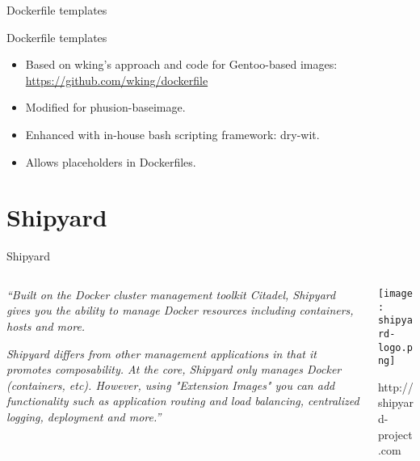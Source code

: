 \documentclass[presentation]{beamer}
\begin{document}
{
\begin{frame}[label=sec-4-6]{Dockerfile templates}

\begin{block}{Dockerfile templates}

\begin{itemize}
\item Based on wking's approach and code for Gentoo-based images:
\url{https://github.com/wking/dockerfile}
\item Modified for phusion-baseimage.
\item Enhanced with in-house bash scripting framework: dry-wit.
\item Allows placeholders in Dockerfiles.
\end{itemize}
\end{block}
\end{frame}} %

\section{Shipyard}
\label{sec-5}

\begin{frame}[label=sec-5-1]{Shipyard}
\begin{columns}
\begin{column}{0.6\textwidth}

\textit{``Built on the Docker cluster management toolkit Citadel, Shipyard gives you the ability to manage Docker resources including containers, hosts and more.}

\textit{Shipyard differs from other management applications in that it promotes composability. At the core, Shipyard only manages Docker (containers, etc). However, using "Extension Images" you can add functionality such as application routing and load balancing, centralized logging, deployment and more.''}
\end{column}

\begin{column}{0.4\textwidth}
\texttt{[image: shipyard-logo.png]}

\small{http://shipyard-project.com}
\end{column}
\end{columns}
\end{frame}
\end{document}
